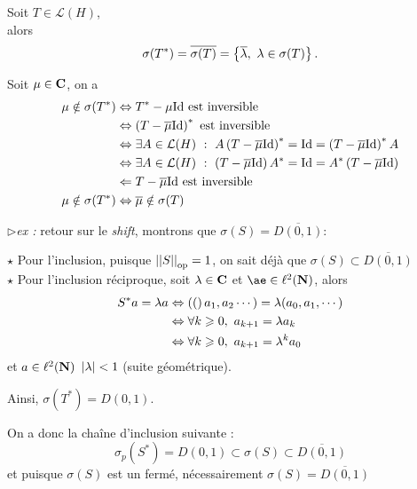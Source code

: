 \documentclass[a4paper,11pt, twoside]{article}
\begin{document}
\begin{prop}
  Soit $T\in\mathcal L(H)$,\\

  alors 
  $$\sigma(T^*)=\overline{\sigma(T)}=\ens{\overline{\lambda},\ \lambda\in\sigma(T)}.$$
\end{prop}


\begin{Proof}
  Soit $\mu\in \mathbf C$, on a 
  \begin{align*}
    \mu\notin\sigma(T^*)&\Leftrightarrow T^*-\mu\Id\text{ est inversible}\\
    &\Leftrightarrow \Par{T-\overline\mu\Id}^*\text{ est inversible}\\
    &\Leftrightarrow\exists A\in\mathcal L(H)\ : \ A\Par{T-\overline\mu\Id}^*=\Id=\Par{T-\overline\mu\Id}^*A\\
    &\Leftrightarrow\exists A\in\mathcal L(H)\ : \ \Par{T-\overline\mu\Id}A^*=\Id=A^*\Par{T-\overline\mu\Id}\\
    &\Leftarrow T-\overline\mu\Id\text{ est inversible}\\
    \mu\notin\sigma(T^*)&\Leftrightarrow\overline{\mu}\notin\sigma(T)
  \end{align*}
\end{Proof}


$\triangleright$\emph{ex :} retour sur le \emph{shift}, montrons que $\sigma(S)=\overline{D(0,1)}$:


\begin{Proof}
  $\star$ Pour l'inclusion, puisque $\left|\left|S\right|\right|_{\mathrm{op}}=1$, on sait déjà que $\sigma(S)\subset\overline{D(0,1)}$\\

  $\star$ Pour l'inclusion réciproque, soit $\lambda\in\mathbf C$ et $æ\in\ell^2(\N)$, alors 
  \begin{align*}
    S^*a=\lambda a&\Leftrightarrow\left((\right)a_1,a_2\cdots)=\lambda(a_0,a_1,\cdots)\\
    &\Leftrightarrow \forall k\geqslant 0,\ a_{k+1}=\lambda a_k\\
    &\Leftrightarrow \forall k\geqslant 0,\ a_{k+1}=\lambda^k a_0\\
  \end{align*}
  et $a\in\ell^2(\mathbf N)$ \ssi $\left| \lambda\right|<1$ (suite géométrique).
  
  Ainsi, $\sigma(T^*)=D(0,1)$.

  On a donc la chaîne d'inclusion suivante : 
  $$\sigma_p(S^*)=D(0,1)\subset \sigma(S)\subset\overline{D(0,1)}$$
  et puisque $\sigma(S)$ est un fermé, nécessairement $\sigma(S)=\overline{D(0,1)}$
\end{Proof}
\end{document}
